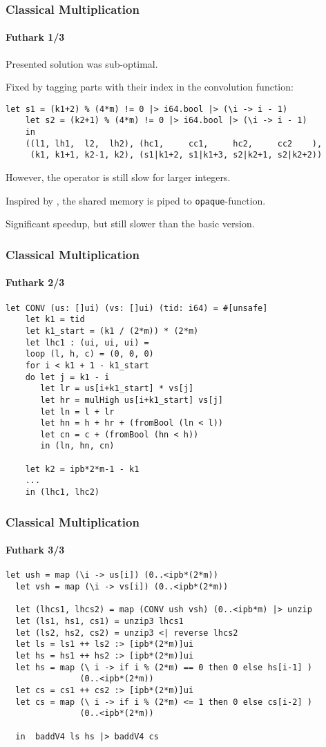 \begin{frame}[fragile]
  \frametitle{Classical Multiplication}
  \framesubtitle{Futhark 1/3}
  Presented solution was sub-optimal.

  Fixed by tagging parts with their index in the convolution function:

  \begin{lstlisting}[language=futhark,basicstyle=\scriptsize,gobble=4]
    let s1 = (k1+2) % (4*m) != 0 |> i64.bool |> (\i -> i - 1)
    let s2 = (k2+1) % (4*m) != 0 |> i64.bool |> (\i -> i - 1)
    in
    ((l1, lh1,  l2,  lh2), (hc1,     cc1,     hc2,     cc2    ),
     (k1, k1+1, k2-1, k2), (s1|k1+2, s1|k1+3, s2|k2+1, s2|k2+2))
   \end{lstlisting}\pause

   However, the operator is still slow for larger integers.

   Inspired by \cite{oancea2024gpu}, the shared memory is piped to
   \texttt{opaque}-function.\pause

   Significant speedup, but still slower than the basic version.
\end{frame}


\begin{frame}[fragile]
  \frametitle{Classical Multiplication}
  \framesubtitle{Futhark 2/3}
  \begin{lstlisting}[language=futhark,basicstyle=\scriptsize,gobble=2]
  let CONV (us: []ui) (vs: []ui) (tid: i64) = #[unsafe]
    let k1 = tid
    let k1_start = (k1 / (2*m)) * (2*m)
    let lhc1 : (ui, ui, ui) =
    loop (l, h, c) = (0, 0, 0)
    for i < k1 + 1 - k1_start
    do let j = k1 - i
       let lr = us[i+k1_start] * vs[j]
       let hr = mulHigh us[i+k1_start] vs[j]
       let ln = l + lr
       let hn = h + hr + (fromBool (ln < l))
       let cn = c + (fromBool (hn < h))
       in (ln, hn, cn)

    let k2 = ipb*2*m-1 - k1
    ...
    in (lhc1, lhc2)
   \end{lstlisting}
\end{frame}


\begin{frame}[fragile]
  \frametitle{Classical Multiplication}
  \framesubtitle{Futhark 3/3}
\begin{lstlisting}[language=futhark,basicstyle=\scriptsize,gobble=2]
  let ush = map (\i -> us[i]) (0..<ipb*(2*m))
  let vsh = map (\i -> vs[i]) (0..<ipb*(2*m))

  let (lhcs1, lhcs2) = map (CONV ush vsh) (0..<ipb*m) |> unzip
  let (ls1, hs1, cs1) = unzip3 lhcs1
  let (ls2, hs2, cs2) = unzip3 <| reverse lhcs2
  let ls = ls1 ++ ls2 :> [ipb*(2*m)]ui
  let hs = hs1 ++ hs2 :> [ipb*(2*m)]ui
  let hs = map (\ i -> if i % (2*m) == 0 then 0 else hs[i-1] )
               (0..<ipb*(2*m))
  let cs = cs1 ++ cs2 :> [ipb*(2*m)]ui
  let cs = map (\ i -> if i % (2*m) <= 1 then 0 else cs[i-2] )
               (0..<ipb*(2*m))

  in  baddV4 ls hs |> baddV4 cs
   \end{lstlisting}
\end{frame}

